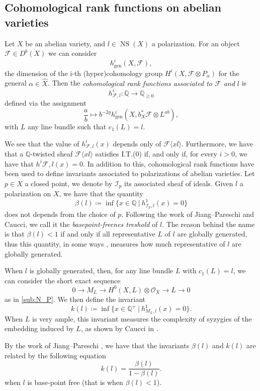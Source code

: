 \documentclass[11pt,letter]{amsart}
\numberwithin{equation}{section}
\begin{document}
\subsection{Cohomological rank functions on abelian varieties}\label{crf}

Let $X$ be an abelian variety, and $l\in\operatorname{NS}(X)$ a polarization. 
For an object $\mathcal{F}\in D^b(X)$  we can consider
$$
h^i_{\text{gen}}(X,\mathcal{F}),
$$
the dimension of the i-th (hyper)cohomology group $H^i(X,\mathcal{F}\otimes P_  \alpha)$ for the general $  \alpha\in\hat{X}$. Then the \emph{cohomological rank functions associated to $\mathcal{F}$ and $l$} is 
$$h^i_{\mathcal{F},l}:\mathbb{Q}\rightarrow\mathbb{Q}_{\ge 0}$$ defined via the assignment
$$\frac{a}{b}\mapsto b^{-2g}h^i_{\text{gen}}(X,b_X^*\mathcal{F}\otimes L^{ab}),$$
with $L$ any line bundle such that $c_1(L)=l$.\par
We see that the value of $h^i_{\mathcal{F},l}(x)$ depends only of $\mathcal{F}\langle xl\rangle$. Furthermore, we have that a $\mathbb{Q}$-twisted sheaf $\mathcal{F}\langle xl\rangle$ satisfies I.T.(0) if, and only if, for every $i>0$, we have that $h^i{\mathcal{F},l}(x)=0$. In addition to this, cohomological rank functions have been used to define invariants associated to polarizations of abelian varieties. Let $p\in X$ a closed point, we denote by $\mathcal{I}_p$ its associated sheaf of ideals. Given $l$ a polarization on $X$, we have that the quantity
\[\beta(l)\coloneqq\operatorname{inf}\{x\in\mathbb{Q}\:|\: h^1_{\mathcal{I}_p,l}(x)=0\}\]
does not depends from the choice of $p$. Following the work of Jiang--Pareschi and Caucci, we call it the \emph{basepoint-freenes treshold} of $l$. The reason behind the name is that $\beta(l)<1$ if and only if all representative $L$ of $l$
 are globally generated, thus this quantity, in some ways , measures how much representative of $l$ are globally generated.\par
 When $l$ is globally generated, then, for any line bundle $L$ with $c_1(L)=l$, we can consider the short exact sequence
 \begin{equation}\label{sesimportant}
     0\rightarrow M_L\longrightarrow H^0(X,L)\otimes\mathcal{O}_X\longrightarrow L\rightarrow 0
 \end{equation}
 as in \ref{sub:N_P}. We then define the invariant
 \[
 k(l)\coloneqq \inf\{x\in\mathbb{Q}^+\:|\: h^1_{M_L,l}(x)=0\}.
 \]
 When $L$ is very ample, this invariant measures the complexity of syzygies of the embedding induced by $L$, as shown by Caucci in \cite{Caucci}.\par
 By the work of Jiang--Pareschi \cite[Thm. D]{JiPa2020}, we have that the invariants $\beta(l)$ and $k(l)$ are related by the following equation
 \begin{equation}\label{eq:kappabeta}
     k(l)=\frac{\beta(l)}{1-\beta(l)}.
 \end{equation}
  when $l$ is base-point free (that is when $\beta(l)<1$).
\end{document}
